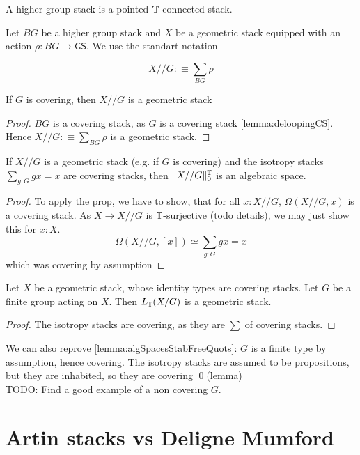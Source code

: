 \documentclass{article}
\renewcommand{\GS}{\mathsf{GS}}
\begin{document}
\begin{definition}
	A higher group stack is a pointed $\mathbb{T}$-connected stack.
\end{definition}
Let $BG$ be a higher group stack and $X$ be a geometric stack equipped with an action $\rho : BG \to \GS$. We use the standart notation

\[
X // G :\equiv \sum_{BG} \rho
\]
\begin{lemma}
 If $G$ is covering, then $X // G$ is a geometric stack
\end{lemma}
\begin{proof}
	$BG$ is a covering stack, as $G$ is a covering stack \ref{lemma:deloopingCS}. Hence $X // G :\equiv \sum_{BG} \rho$ is a geometric stack.
\end{proof}
\begin{prop}
	If $X // G$ is a geometric stack (e.g. if $G$ is covering) and the isotropy stacks $\sum_{g : G} g x = x$ are covering stacks, then $\| X // G \|_0^{\mathbb{T}}$ is an algebraic space.
\end{prop}
\begin{proof}
	To apply the prop, we have to show, that for all $x : X // G$, $\Omega (X // G,x)$ is a covering stack. As $X \to X // G$ is $\mathbb{T}$-surjective (todo details), we may just show this for $x : X$.
	\[
	\Omega (X // G , [x]) \simeq \sum_{g: G} g x = x
	\]
	which was covering by assumption
\end{proof}
\begin{corollary}
	Let $X$ be a geometric stack, whose identity types are covering stacks. Let $G$ be a finite group acting on $X$. Then $L_{\mathbb{T}} (X / G)$ is a geometric stack.
\end{corollary}
\begin{proof}
	 The isotropy stacks are covering, as they are $\sum$ of covering stacks.
\end{proof}
We can also reprove \ref{lemma:algSpacesStabFreeQuots}: $G$ is a finite type by assumption, hence covering. The isotropy stacks are assumed to be propositions, but they are inhabited, so they are covering \qed(lemma) \\

TODO: Find a good example of a non covering $G$.

\section{Artin stacks vs Deligne Mumford}
\end{document}
